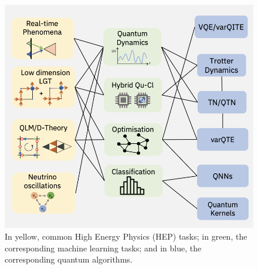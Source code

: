 \begin{figure}
    \centering
    \includegraphics[scale=0.45]{sections/chapters/Chapter1/Images/exp-qc.png}
    \caption{In yellow, common High Energy Physics (HEP) tasks; in green, the corresponding machine 
    learning tasks; and in blue, the corresponding quantum algorithms.}
\end{figure}





